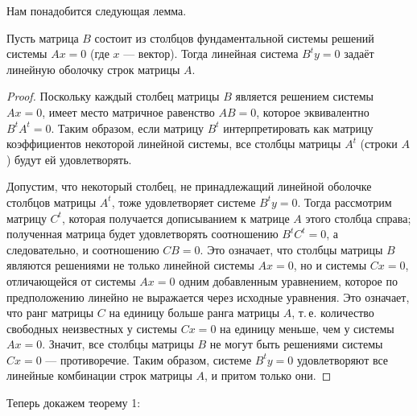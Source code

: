 Нам понадобится следующая лемма.

\begin{lemma}
    Пусть матрица $B$ состоит из столбцов фундаментальной системы решений системы $Ax = 0$ (где $x$ --- вектор). Тогда линейная система $B^ty = 0$ задаёт линейную оболочку строк матрицы $A$.
\end{lemma}

\begin{proof}
    Поскольку каждый столбец матрицы $B$ является решением системы $Ax = 0$, имеет место матричное равенство $AB = 0$, которое эквивалентно $B^tA^t = 0$. Таким образом, если матрицу $B^t$ интерпретировать как матрицу коэффициентов некоторой линейной системы, все столбцы матрицы $A^t$ (строки $A$) будут ей удовлетворять.

    Допустим, что некоторый столбец, не принадлежащий линейной оболочке столбцов матрицы $A^t$, тоже удовлетворяет системе $B^ty = 0$. Тогда рассмотрим матрицу $C^t$, которая получается дописыванием к матрице $A$ этого столбца справа; полученная матрица будет удовлетворять соотношению $B^tC^t = 0$, а следовательно, и соотношению $CB = 0$. Это означает, что столбцы матрицы $B$ являются решениями не только линейной системы $Ax = 0$, но и системы $Cx = 0$, отличающейся от системы $Ax = 0$ одним добавленным уравнением, которое по предположению линейно не выражается через исходные уравнения. Это означает, что ранг матрицы $C$ на единицу больше ранга матрицы $A$, т.\,е. количество свободных неизвестных у системы $Cx = 0$ на единицу меньше, чем у системы $Ax = 0$. Значит, все столбцы матрицы $B$ не могут быть решениями системы $Cx = 0$ --- противоречие. Таким образом, системе $B^ty = 0$ удовлетворяют все линейные комбинации строк матрицы $A$, и притом только они.
\end{proof}

Теперь докажем теорему 1:

